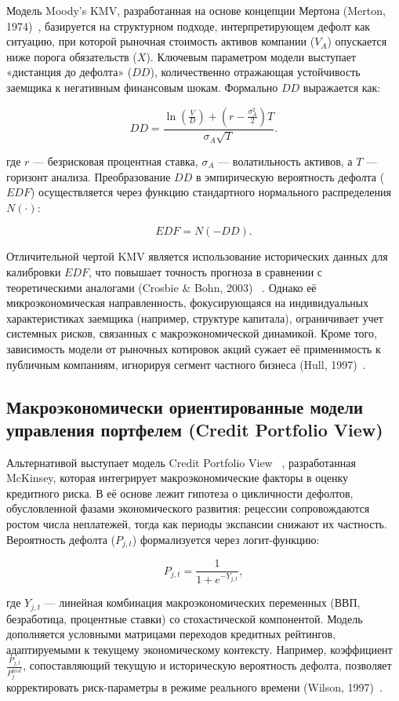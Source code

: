 \documentclass[]{article}
\begin{document}
	Модель Moody’s KMV, разработанная на основе концепции Мертона (Merton, 1974)~\cite{merton1974}, базируется на
	структурном подходе, интерпретирующем дефолт как ситуацию, при которой рыночная стоимость активов компании
	(\(V_A\)) опускается ниже порога обязательств (\(X\)). Ключевым параметром модели выступает «дистанция до
	дефолта» (\(DD\)), количественно отражающая устойчивость заемщика к негативным финансовым шокам. Формально \(DD\)
	выражается как:

	\[
	DD = \frac{\ln\left(\frac{V}{D}\right) + \left(r - \frac{\sigma_A^2}{2}\right)T}{\sigma_A \sqrt{T}}.
	\]

	где \(r\) — безрисковая процентная ставка, \(\sigma_A\) — волатильность активов, а \(T\) — горизонт анализа.
	Преобразование \(DD\) в эмпирическую вероятность дефолта (\(EDF\)) осуществляется через функцию стандартного
	нормального распределения \(N(\cdot)\):

	\[
	EDF = N(-DD).
	\]

	Отличительной чертой KMV является использование исторических данных для калибровки \(EDF\), что повышает точность
	прогноза в сравнении с теоретическими аналогами (Crosbie \& Bohn, 2003) ~\cite{crosbie2003}. Однако её
	микроэкономическая направленность, фокусирующаяся на индивидуальных характеристиках заемщика (например, структуре
	капитала), ограничивает учет системных рисков, связанных с макроэкономической динамикой. Кроме того, зависимость
	модели от рыночных котировок акций сужает её применимость к публичным компаниям, игнорируя сегмент частного
	бизнеса (Hull, 1997)~\cite{hull1997}.

	\subsection{Макроэкономически ориентированные модели управления портфелем (Credit Portfolio View)}

	Альтернативой выступает модель Credit Portfolio View ~\cite{wilson1997}, разработанная McKinsey, которая
	интегрирует макроэкономические факторы в оценку кредитного риска. В её основе лежит гипотеза о цикличности
	дефолтов, обусловленной фазами экономического развития: рецессии сопровождаются ростом числа неплатежей, тогда как
	периоды экспансии снижают их частность. Вероятность дефолта (\(P_{j,t}\)) формализуется через логит-функцию:

	\[
	P_{j,t} = \frac{1}{1 + e^{-Y_{j,t}}},
	\]

	где \(Y_{j,t}\) — линейная комбинация макроэкономических переменных (ВВП, безработица, процентные ставки) со
	стохастической компонентой. Модель дополняется условными матрицами переходов кредитных рейтингов, адаптируемыми к
	текущему экономическому контексту. Например, коэффициент \(\frac{P_{j,t}}{P_{j}^{hist}}\), сопоставляющий текущую
	и историческую вероятность дефолта, позволяет корректировать риск-параметры в режиме реального времени (Wilson,
	1997)~\cite{wilson1997}.
\end{document}
